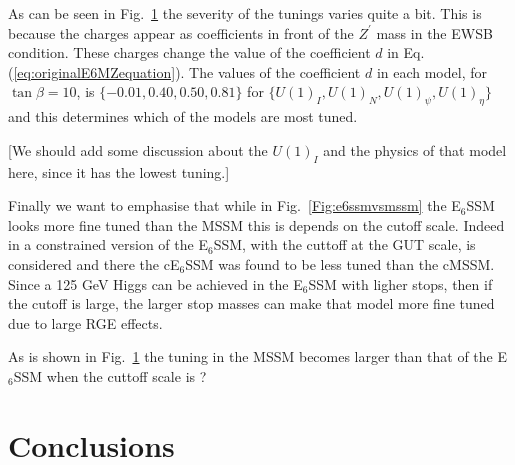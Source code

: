 \documentclass[preprint,amsmath,amssymb,aps,superscriptaddress,prd,showpacs,floatfix]{revtex4-1}
\begin{document}


As can be seen in Fig.~\ref{} the severity of the tunings varies quite a
bit.  This is because the charges appear as coefficients in front of
the $Z^\prime$ mass in the EWSB condition.  These charges change the
value of the coefficient $d$ in Eq. (\ref{eq:originalE6MZequation}).  The values of the
coefficient $d$ in each model, for $\tan\beta = 10$, is $\{-0.01, 0.40, 0.50, 0.81 \}$ for
$\{U(1)_I, U(1)_N, U(1)_\psi, U(1)_\eta \}$ and this determines which
of the models are most tuned.


[We should add some discussion about the $U(1)_I$ and the physics of
  that model here, since it has the lowest tuning.]

Finally we want to emphasise that while in Fig.~\ref{Fig:e6ssmvsmssm}
the E$_6$SSM looks more fine tuned than the MSSM this is depends on
the cutoff scale.  Indeed in \cite{Athron:2013ipa} a constrained
version of the E$_6$SSM, with the cuttoff at the GUT scale, is
considered and there the cE$_6$SSM was found to be less tuned than the
cMSSM. Since a 125 GeV Higgs can be achieved in the E$_6$SSM with
ligher stops, then if the cutoff is large, the larger stop masses can
make that model more fine tuned due to large RGE effects.


As is shown in Fig.~\ref{} the tuning in the MSSM becomes larger
than that of the E$_6$SSM when the cuttoff scale is ? 
     




\section{\label{sec:conclusion}Conclusions}
\appendix
\end{document}
